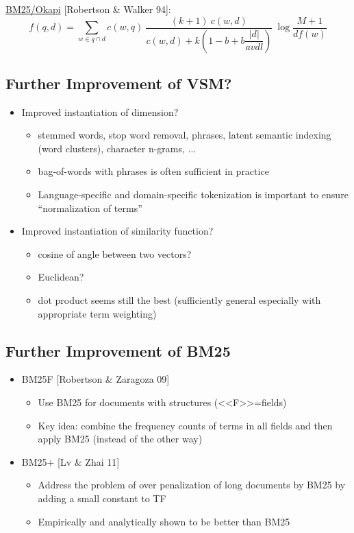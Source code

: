 \href{https://ru.wikipedia.org/wiki/Okapi_BM25}{BM25/Okapi} [Robertson \& Walker 94]:
\begin{equation*}
f(q, d) = \sum_{w \in q \cap d} c(w, q) \: \frac{(k+1) \: c(w, d)}{c(w, d) + k\left(1-b+b\dfrac{|d|}{avdl}\right)} \: \log\frac{M+1}{df(w)}
\end{equation*}

\subsection{Further Improvement of VSM?}
\begin{itemize}
\item Improved instantiation of dimension?
\begin{itemize}
\item  stemmed words, stop word removal, phrases, latent semantic indexing (word clusters), character n-grams, ...
\item  bag-of-words with phrases is often sufficient in practice
\item  Language-specific and domain-specific tokenization is important to
ensure “normalization of terms”
\end{itemize}

\item  Improved instantiation of similarity function?
\begin{itemize}
\item  cosine of angle between two vectors?
\item  Euclidean?
\item  dot product seems still the best (sufficiently general especially with appropriate term weighting)
\end{itemize}
\end{itemize}

\subsection{Further Improvement of BM25}
\begin{itemize}
\item BM25F [Robertson \& Zaragoza 09]
\begin{itemize}
\item Use BM25 for documents with structures (<<F>>=fields)
\item Key idea: combine the frequency counts of terms in all fields and then apply BM25 (instead of the other way)
\end{itemize}

\item BM25+ [Lv \& Zhai 11]
\begin{itemize}
\item Address the problem of over penalization of long documents
by BM25 by adding a small constant to TF
\item Empirically and analytically shown to be better than BM25
\end{itemize}
\end{itemize}


